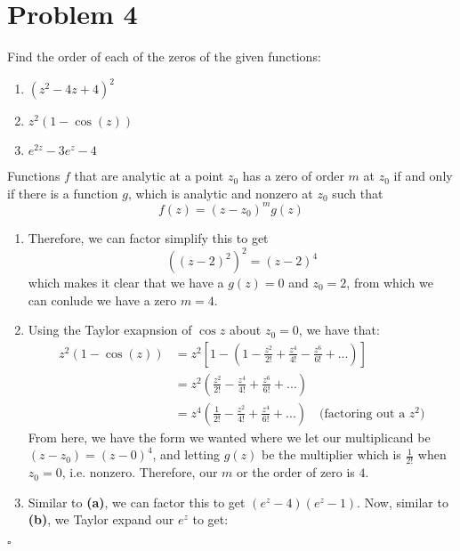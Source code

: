 \documentclass[11pt]{article}
\newenvironment{proof}{\noindent{\bf Proof.}}{\hfill $\square$\medskip}
\begin{document}
\newpage
\section{Problem 4}
Find the order of each of the zeros of the given functions:
\begin{enumerate}[label=\textbf{(\alph*)}]
    \item $(z^{2}-4z+4)^{2}$
    \item $z^{2}(1-\cos(z))$
    \item $e^{2z}-3e^{z}-4$
\end{enumerate}

\begin{proof}
    Functions $f$ that are analytic at a point $z_{0}$ has a zero of order $m$ at $z_{0}$ if and only if there is a function $g$, which is analytic and nonzero at $z_{0}$ such that
    $$f(z)=(z-z_{0})^{m}g(z)$$
    \begin{enumerate}[label=\textbf{(\alph*)}]
        \item Therefore, we can factor simplify this to get
              $$((z-2)^{2})^{2}=(z-2)^{4}$$
              which makes it clear that we have a $g(z)=0$ and $z_{0}=2$, from which we can conlude we have a zero $m=4$.
        \item Using the Taylor exapnsion of $\cos z$ about $z_{0}=0$, we have that:
              \begin{equation}
                  \begin{split}
                      z^{2}(1-\cos(z))&=z^{2}\left[1-\left(1-\frac{z^{2}}{2!}+\frac{z^{4}}{4!}-\frac{z^{6}}{6!}+...\right)\right]\\
                      &=z^{2}\left(\frac{z^{2}}{2!}-\frac{z^{4}}{4!}+\frac{z^{6}}{6!}+...\right)\\
                      &=z^{4}\left(\frac{1}{2!}-\frac{z^{2}}{4!}+\frac{z^{4}}{6!}+...\right)\quad\text{(factoring out a }z^{2}\text{)}
                  \end{split}
              \end{equation}
              From here, we have the form we wanted where we let our multiplicand be $(z-z_{0})=(z-0)^{4}$, and letting $g(z)$ be the multiplier which is $\frac{1}{2!}$ when $z_{0}=0$, i.e. nonzero. Therefore, our $m$ or the order of zero is $4$.
        \item Similar to \textbf{(a)}, we can factor this to get $(e^{z}-4)(e^{z}-1)$. Now, similar to \textbf{(b)}, we Taylor expand our $e^{z}$ to get:
    \end{enumerate}
\end{proof}
\end{document}
